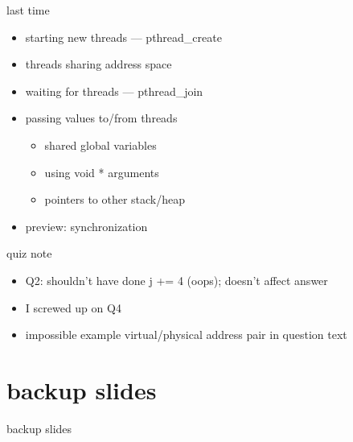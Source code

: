 \date{}
\title{}
\date{}

\begin{frame}
    \titlepage
\end{frame}



\begin{frame}{last time}
    \begin{itemize}
    \item starting new threads --- pthread\_create
    \item threads sharing address space
    \item waiting for threads --- pthread\_join
    \item passing values to/from threads
        \begin{itemize}
        \item shared global variables
        \item using void * arguments
        \item pointers to other stack/heap
        \end{itemize}
    \item preview: synchronization
    \end{itemize}
\end{frame}

\begin{frame}{quiz note}
    \begin{itemize}
    \item Q2: shouldn't have done j += 4 (oops); doesn't affect answer
    \vspace{.5cm}
    \item I screwed up on Q4
    \item impossible example virtual/physical address pair in question text
    \end{itemize}
\end{frame}





\section{backup slides}
\begin{frame}{backup slides}
\end{frame}


